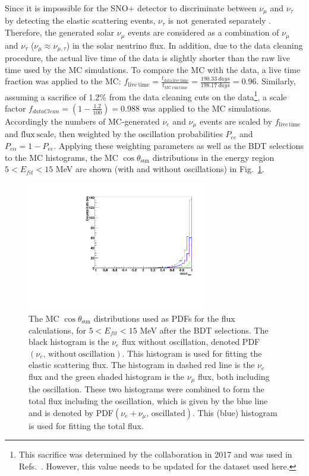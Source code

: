 {Since it is impossible for the SNO+ detector to discriminate between $\nu_\mu$ and $\nu_\tau$ by detecting the elastic scattering events, $\nu_\tau$ is not generated separately \cite{marzec2019measurement}. Therefore, the generated solar $\nu_\mu$ events are considered as a combination of $\nu_\mu$ and $\nu_\tau$ ($\nu_\mu\approx\nu_{\mu,\tau}$) in the solar neutrino flux. In addition, due to the data cleaning procedure, the actual live time of the data is slightly shorter than the raw live time used by the MC simulations. To compare the MC with the data, a live time fraction was applied to the MC: $f_\mathrm{live~time}=\frac{t_\mathrm{data~live~time}}{t_\mathrm{MC~run~time}}=\frac{190.33~days}{198.17~days} = 0.96$. Similarly, assuming a sacrifice of 1.2\% from the data cleaning cuts on the data\footnote{This sacrifice was determined by the collaboration in 2017 \cite{morganDataClean} and was used in Refs.~\cite{marzec2019measurement}. However, this value needs to be updated for the dataset used here.}, a scale factor $f_{dataClean}=(1-\frac{1.2}{100})=0.988$ was applied to the MC simulations. Accordingly the numbers of MC-generated $\nu_e$ and $\nu_\mu$ events are scaled by $f_\mathrm{live\, time}$ and $\mathrm{flux~scale}$, then weighted by the oscillation probabilities $P_{ee}$ and $P_{e\alpha}=1-P_{ee}$. Applying these weighting parameters as well as the BDT selections to the MC histograms, the MC $\cos\theta_\mathrm{sun}$ distributions in the energy region $5<E_{fit}<15$ MeV are shown (with and without oscillations) in Fig.~\ref{fig:MCfluxPdfs}.

\begin{figure}[!htb]
	\centering
	\includegraphics[width=8cm]{MCfluxPdfs.pdf}
	\caption[The MC $\cos\theta_\mathrm{sun}$ distributions used as PDFs for the flux calculations after the BDT selections ($5<E_{fit}<15$ MeV).]{The MC $\cos\theta_\mathrm{sun}$ distributions used as PDFs for the flux calculations, for $5<E_{fit}<15$ MeV after the BDT selections. The black histogram is the $\nu_e$ flux without oscillation, denoted PDF$(\nu_e, \, \mathrm{without~oscillation})$. This histogram is used for fitting the elastic scattering flux. The histogram in dashed red line is the $\nu_e$ flux and the green shaded histogram is the $\nu_\mu$ flux, both including the oscillation. These two histograms were combined to form the total flux including the oscillation, which is given by the blue line and is denoted by PDF$(\nu_e+\nu_\mu, \, \mathrm{oscillated})$. This (blue) histogram is used for fitting the total flux.\label{fig:MCfluxPdfs}}
\end{figure} 

}
